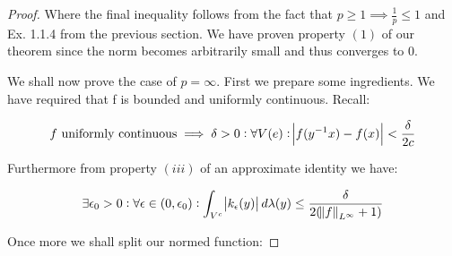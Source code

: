 \begin{proof}
Where the final inequality follows from the fact that $p \geq 1 \implies \frac{1}{p} \leq 1$ and Ex. 1.1.4 from the previous section. We have proven property $(1)$ of our theorem since the norm becomes arbitrarily small and thus converges to 0.

We shall now prove the case of $ p = \infty$. First we prepare some ingredients. We have required that f is bounded and uniformly continuous. Recall:

\begin{align*}
f \text{ uniformly continuous} \implies \delta > 0 : \forall  V(e): \abs{f(y^{-1}x)-f(x)} < \frac{\delta}{2c}
\end{align*}

Furthermore from property $(iii)$ of an approximate identity we have:

\begin{align*}
\exists \epsilon_0 > 0 : \forall \epsilon \in (0,\epsilon_0): \int_{V^c} \abs{k_\epsilon(y)} d\lambda(y) \leq \frac{\delta}{2(\norm{f}_{L^\infty}+1)}
\end{align*}

Once more we shall split our normed function:


\end{proof}
